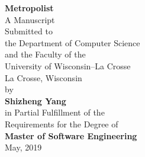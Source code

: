 \begin{titlepage}
	\begin{center}
		\vspace*{0.5in}
		\begin{doublespace}
			\LARGE \textbf{Metropolist} \\
			\vspace*{1in}
			\normalsize
			A Manuscript \\
			Submitted to \\
			the Department of Computer Science \\
			and the Faculty of the\\
			University of Wisconsin--La Crosse \\
			La Crosse, Wisconsin \\
			\vspace*{0.5in}
			by \\
			\large
			\textbf{Shizheng Yang} \\

			\vspace*{0.5in}
			\normalsize
			in Partial Fulfillment of the \\
			Requirements for the Degree of\\
			\Large{\textbf{Master of Software Engineering}} \\
			\normalsize
			May, 2019
		\end{doublespace}
	\end{center}
\end{titlepage}

